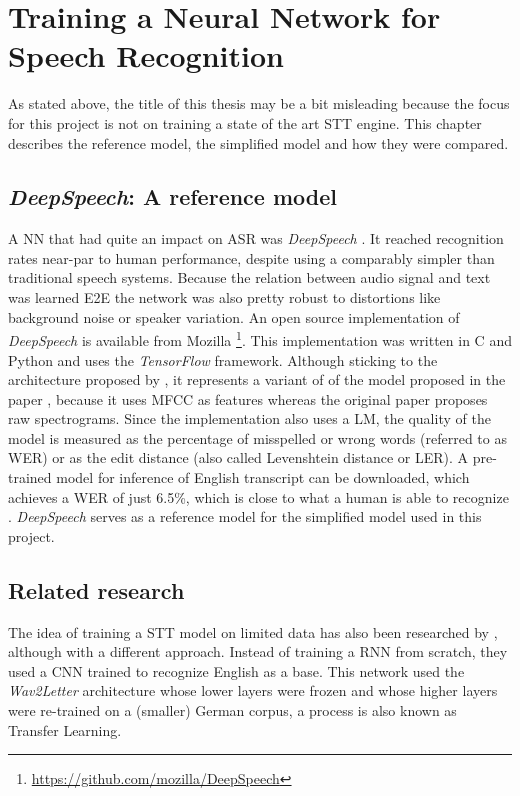 \section{Training a Neural Network for Speech Recognition}\label{ds}
As stated above, the title of this thesis may be a bit misleading because the focus for this project is not on training a state of the art \ac{STT} engine. This chapter describes the reference model, the simplified model and how they were compared.

\subsection{\textit{DeepSpeech}: A reference model}

A \ac{NN} that had quite an impact on \ac{ASR} was \textit{DeepSpeech} \parencite{deepspeech}. It reached recognition rates near-par to human performance, despite using a comparably simpler than traditional speech systems. Because the relation between audio signal and text was learned \ac{E2E} the network was also pretty robust to distortions like background noise or speaker variation. An open source implementation of  \textit{DeepSpeech} is available from Mozilla \footnote{\url{https://github.com/mozilla/DeepSpeech}}. This implementation was written in C and Python and uses the \textit{TensorFlow} framework. Although sticking to the architecture proposed by \cite{deepspeech}, it represents a variant of of the model proposed in the paper \parencite{ctc_paper}, because it uses \ac{MFCC} as features whereas the original paper proposes raw spectrograms. Since the implementation also uses a \ac{LM}, the quality of the model is measured as the percentage of misspelled or wrong words (referred to as \ac{WER}) or as the edit distance (also called Levenshtein distance or \ac{LER}). A pre-trained model for inference of English transcript can be downloaded, which achieves a \ac{WER} of just 6.5\%, which is close to what a human is able to recognize \parencite{mozillajourney}. \textit{DeepSpeech} serves as a reference model for the simplified model used in this project.

\subsection{Related research}

The idea of training a \ac{STT} model on limited data has also been researched by \cite{budget}, although with a different approach. Instead of training a \ac{RNN} from scratch, they used a \ac{CNN} trained to recognize English as a base. This network used the \textit{Wav2Letter} \parencite{wav2letter} architecture whose lower layers were frozen and whose higher layers were re-trained on a (smaller) German corpus, a process is also known as Transfer Learning. 


